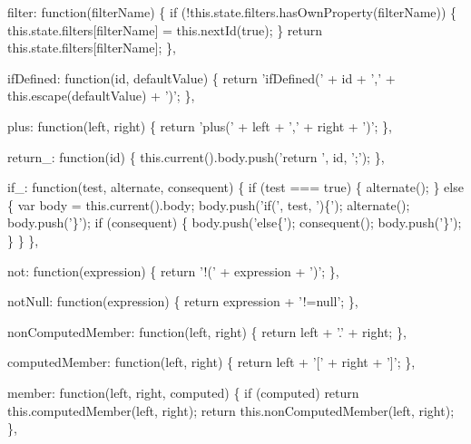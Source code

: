 \begin{DoxyCodeInclude}
{{{  filter: \textcolor{keyword}{function}(filterName) \{
    \textcolor{keywordflow}{if} (!this.state.filters.hasOwnProperty(filterName)) \{
      this.state.filters[filterName] = this.nextId(\textcolor{keyword}{true});
    \}
    \textcolor{keywordflow}{return} this.state.filters[filterName];
  \},

  ifDefined: \textcolor{keyword}{function}(id, defaultValue) \{
    \textcolor{keywordflow}{return} \textcolor{stringliteral}{'ifDefined('} + \textcolor{keywordtype}{id} + \textcolor{charliteral}{','} + this.escape(defaultValue) + \textcolor{charliteral}{')'};
  \},

  plus: \textcolor{keyword}{function}(left, right) \{
    \textcolor{keywordflow}{return} \textcolor{stringliteral}{'plus('} + left + \textcolor{charliteral}{','} + right + \textcolor{charliteral}{')'};
  \},

  return\_: \textcolor{keyword}{function}(id) \{
    this.current().body.push(\textcolor{stringliteral}{'return '}, \textcolor{keywordtype}{id}, \textcolor{charliteral}{';'});
  \},

  if\_: \textcolor{keyword}{function}(test, alternate, consequent) \{
    \textcolor{keywordflow}{if} (test === \textcolor{keyword}{true}) \{
      alternate();
    \} \textcolor{keywordflow}{else} \{
      var body = this.current().body;
      body.push(\textcolor{stringliteral}{'if('}, test, \textcolor{stringliteral}{')\{'});
      alternate();
      body.push(\textcolor{charliteral}{'\}'});
      \textcolor{keywordflow}{if} (consequent) \{
        body.push(\textcolor{stringliteral}{'else\{'});
        consequent();
        body.push(\textcolor{charliteral}{'\}'});
      \}
    \}
  \},

  not: \textcolor{keyword}{function}(expression) \{
    \textcolor{keywordflow}{return} \textcolor{stringliteral}{'!('} + expression + \textcolor{charliteral}{')'};
  \},

  notNull: \textcolor{keyword}{function}(expression) \{
    \textcolor{keywordflow}{return} expression + \textcolor{stringliteral}{'!=null'};
  \},

  nonComputedMember: \textcolor{keyword}{function}(left, right) \{
    \textcolor{keywordflow}{return} left + \textcolor{charliteral}{'.'} + right;
  \},

  computedMember: \textcolor{keyword}{function}(left, right) \{
    \textcolor{keywordflow}{return} left + \textcolor{charliteral}{'['} + right + \textcolor{charliteral}{']'};
  \},

  member: \textcolor{keyword}{function}(left, right, computed) \{
    \textcolor{keywordflow}{if} (computed) \textcolor{keywordflow}{return} this.computedMember(left, right);
    \textcolor{keywordflow}{return} this.nonComputedMember(left, right);
  \},

}}}
\end{DoxyCodeInclude}
